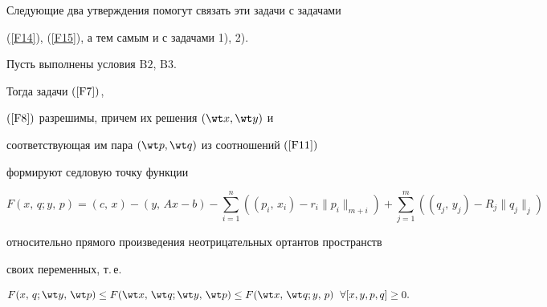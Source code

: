 Следующие два утверждения помогут связать эти задачи с задачами


(\ref{F14}), (\ref{F15}), а тем самым и с задачами 1), 2).





\begin{lemnonum}


Пусть выполнены условия $\mathrm B2$, $\mathrm B3$.


Тогда задачи $(\ref{F7})$,


$(\ref{F8})$ разрешимы, причем их решения $(\wt x, \wt y)$ и


соответствующая им пара $(\wt p, \wt q)$ из соотношений $(\ref{F11})$


формируют седловую точку функции


$$


F(x,\,q; y,\,p)=(c,\, x)-(y,\, Ax-b)-


\sum^{n}_{i=1}((p_i,\, x_i)-r_i\|p_i\|_{m+i})


+\sum^{m}_{j=1}((q_j,\, y_j)-R_j\|q_j\|_j)


$$


относительно прямого произведения неотрицательных ортантов пространств


своих переменных, т.\,е.


$$


F(x,\, q; \wt y,\,\wt p)\le F(\wt x,\, \wt


q; \wt y,\,\wt p)\le F(\wt x,\, \wt q; y,\,p) \ \;


\forall [ x, y, p, q ]\ge 0.


$$


\end{lemnonum}





